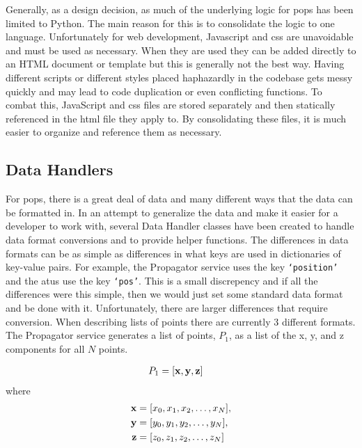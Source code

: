 Generally, as a design decision, as much of the underlying logic for \gls{pops}
has been limited to Python. The main reason for this is to consolidate the
logic to one language. Unfortunately for web development, Javascript and
\gls{css} are unavoidable and must be used as necessary. When they are used
they can be added directly to an HTML document or template but this is
generally not the best way. Having different scripts or different styles placed
haphazardly in the codebase gets messy quickly and may lead to code duplication
or even conflicting functions. To combat this, JavaScript and \gls{css} files
are stored separately and then statically referenced in the \gls{html} file
they apply to. By consolidating these files, it is much easier to organize and
reference them as necessary. 


\subsection{Data Handlers}\label{sec:data_handler}

For \gls{pops}, there is a great deal of data and many different ways that the
data can be formatted in. In an attempt to generalize the data and make it
easier for a developer to work with, several Data Handler classes have been
created to handle data format conversions and to provide helper functions. The
differences in data formats can be as simple as differences in what keys are
used in dictionaries of key-value pairs. For example, the Propagator service
uses the key \texttt{`position'} and the \glspl{atu} use the key
\texttt{`pos'}.  This is a small discrepency and if all the differences were
this simple, then we would just set some standard data format and be done with
it.  Unfortunately, there are larger differences that require conversion. When
describing lists of points there are currently 3 different formats. The
Propagator service generates a list of points, $P_1$, as a list of the x, y,
and z components for all $N$ points. 

\begin{align*}
    P_1 &= [\bm{\mathrm{x}}, \bm{\mathrm{y}}, \bm{\mathrm{z}}] 
\end{align*}
where
\begin{align*}
    \bm{\mathrm{x}} &= [x_0, x_1, x_2, \ldots, x_N],  \\
    \bm{\mathrm{y}} &= [y_0, y_1, y_2, \ldots, y_N],  \\
    \bm{\mathrm{z}} &= [z_0, z_1, z_2, \ldots, z_N]
\end{align*}

